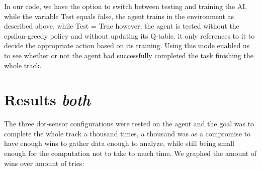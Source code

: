 In our code, we have the option to switch between testing and training the AI, while the variable Test equals false, the agent trains in the environment as described above, while Test = True however, the agent is tested without the epsilon-greedy policy and without updating its Q-table. it only references to it to decide the appropriate action based on its training. Using this mode enabled us to see whether or not the agent had successfully completed the task finishing the whole track. 
\newpage \section{Results \small\textit{both}} 
The three dot-sensor configurations were tested on the agent and the goal was to complete the whole track a thousand times, a thousand was as a compromise to have enough wins to gather data enough to analyze, while still being small enough for the computation not to take to much time. We graphed the amount of wins over amount of tries:
